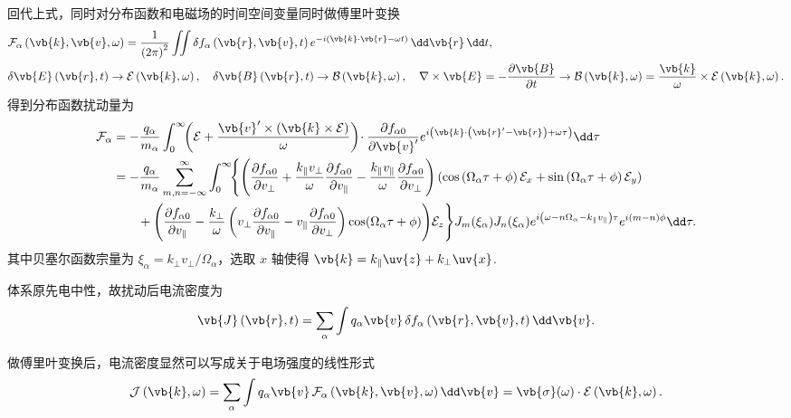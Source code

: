 回代上式，同时对分布函数和电磁场的时间空间变量同时做傅里叶变换
\begin{align*}
	&\mathcal{F}_\alpha\left( \vb{k},\vb{v},\omega \right) = \frac{1}{\left(2\pi\right)^2}\iint \delta f_\alpha\left( \vb{r},\vb{v},t \right)e^{-i\left( \vb{k}\cdot\vb{r}-\omega t \right)}\,\dd \vb{r}\,\dd t,\\
	&\delta\vb{E}\left( \vb{r},t \right) \to \mathcal{E}\left( \vb{k},\omega \right),\quad
	\delta\vb{B}\left( \vb{r},t \right) \to \mathcal{B}\left( \vb{k},\omega \right),\quad\nabla \times \vb{E} = -\frac{\partial \vb{B}}{\partial t} \to \mathcal{B}\left( \vb{k},\omega \right) = \frac{\vb{k}}{\omega} \times \mathcal{E}\left( \vb{k},\omega \right).
\end{align*}
得到分布函数扰动量为
\begin{align*}
	\mathcal{F}_\alpha &= -\frac{q_\alpha}{m_\alpha}\int_0^\infty\!\!\left( \mathcal{E}+\frac{\vb{v}'\times\left( \vb{k}\times\mathcal{E} \right)}{\omega} \right)\!\cdot\frac{\partial f_{\alpha0}}{\partial \vb{v}'} e^{i\left( \vb{k}\cdot\left( \vb{r}'-\vb{r} \right)+\omega\tau \right)}\dd \tau \\&= -\frac{q_\alpha}{m_\alpha}\sum_{m,n=-\infty}^{\infty}\int_0^\infty\!\!\Bigg\{ \Bigg( \frac{\partial f_{\alpha0}}{\partial v_\perp}+\frac{k_\parallel v_\perp}{\omega}\frac{\partial f_{\alpha0}}{\partial v_\parallel}-\frac{k_\parallel v_\parallel}{\omega}\frac{\partial f_{\alpha0}}{\partial v_\perp} \Bigg)\left( \cos\left(\Omega_\alpha\tau+\phi\right)\mathcal{E}_x+\sin\left(\Omega_\alpha\tau+\phi\right)\mathcal{E}_y \right) \\&\quad\quad+ \Bigg( \frac{\partial f_{\alpha0}}{\partial v_\parallel}-\frac{k_\perp}{\omega}\left( v_\perp\frac{\partial f_{\alpha0}}{\partial v_\parallel}-v_\parallel\frac{\partial f_{\alpha0}}{\partial v_\perp} \right)\cos(\Omega_\alpha\tau+\phi) \Bigg)\mathcal{E}_z \Bigg\}J_m(\xi_\alpha)J_n(\xi_\alpha)e^{i\left( \omega-n\Omega_\alpha-k_\parallel v_\parallel \right)\tau}e^{i(m-n)\phi}\dd \tau.
\end{align*}
其中贝塞尔函数宗量为 \(\xi_\alpha = k_\perp v_\perp/\Omega_\alpha\)，选取 \(x\) 轴使得 \(\vb{k} = k_\parallel \uv{z} + k_\perp \uv{x}\).

体系原先电中性，故扰动后电流密度为
\begin{align*}
	\vb{J}\left( \vb{r},t \right) = \sum_\alpha \int q_\alpha \vb{v}\,\delta f_\alpha\left( \vb{r},\vb{v},t \right)\dd \vb{v}.
\end{align*}

做傅里叶变换后，电流密度显然可以写成关于电场强度的线性形式
\begin{align*}
	\mathcal{J}\left( \vb{k},\omega \right) = \sum_\alpha \int q_\alpha \vb{v}\,\mathcal{F}_\alpha\left( \vb{k},\vb{v},\omega \right)\dd \vb{v} = \vb{\sigma}(\omega)\cdot\mathcal{E}\left( \vb{k},\omega \right).
\end{align*}


